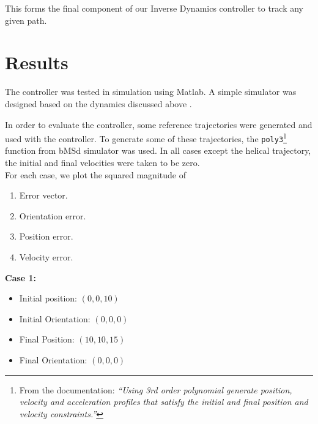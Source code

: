\documentclass[12pt,fleqn]{article}
\begin{document}
This forms the final component of our Inverse Dynamics controller to
track any given path.

\section{Results}
\label{results}

The controller was tested in simulation using Matlab. A simple simulator
was designed based on the dynamics discussed above \cite{github}.

In order to evaluate the controller, some reference trajectories were
generated and used with the controller. To generate some of these
trajectories, the \texttt{poly3}\footnote{From the documentation:
\textit{``Using 3rd order polynomial generate position, velocity and
acceleration profiles that satisfy the initial and final position and
velocity constraints.''}} function from bMSd simulator
\cite{courseWeb} was used. In all cases except the helical trajectory, the initial and final
velocities were taken to be zero. \\

For each case, we plot the squared magnitude of 
\begin{enumerate}
\item Error vector.
\item Orientation error.
\item Position error.
\item Velocity error.
\end{enumerate}
\newpage
\textbf{Case 1:}
\begin{itemize}
\item Initial position: $(0,0,10)$
\item Initial Orientation: $(0,0,0)$
\item Final Position: $(10,10,15)$
\item Final Orientation: $(0,0,0)$
\end{itemize}
\end{document}
